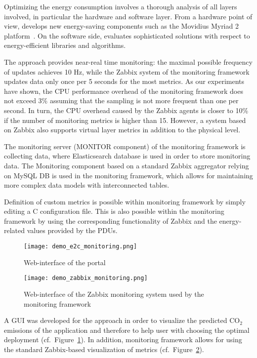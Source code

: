 \documentclass[10pt,letterpaper]{IEEEtran}
\begin{document}
Optimizing the energy consumption involves a thorough analysis of all layers involved, in particular the
hardware and software layer. From a hardware point of view, \EXCESS develops new energy-saving components
such as the Movidius Myriad 2 platform~\cite{movidius14}. On the software side, \EXCESS evaluates sophisticated solutions with respect to
energy-efficient libraries and algorithms. 

The \EXCESS approach provides near-real time monitoring: the maximal possible frequency of updates achieves 10 Hz,
while the Zabbix system of the \ECO monitoring framework updates data only once per 5 seconds for the most metrics.
As our experiments have shown, the CPU performance overhead of the \EXCESS monitoring framework does not
exceed 3\% assuming that the sampling is not more frequent than one per second.
In turn, the CPU overhead caused by the \ECO Zabbix agents is closer to 10\% if the number of monitoring metrics is
higher than 15. However, a system based on Zabbix also supports virtual layer metrics
in addition to the physical level. 

The monitoring server (MONITOR component) of the \EXCESS monitoring framework is collecting data,
where Elasticsearch database is used in order to store monitoring data.
The \ECO Monitoring component based on a standard Zabbix aggregator relying on
MySQL DB is used in the \ECO monitoring framework, which allows for maintaining more complex
data models with interconnected tables.

Definition of custom metrics is possible within \EXCESS monitoring framework by simply editing a C configuration file.
This is also possible within the \ECO monitoring framework by using the corresponding functionality of Zabbix
and the energy-related values provided by the PDUs.



\begin{figure}[t]
	\centering
	\texttt{[image: demo\_e2c\_monitoring.png]}
	\caption{Web-interface of the \ECO portal}
	\label{fig:demo_e2c_monitoring}
\end{figure}

\begin{figure}[t]
	\centering
	\texttt{[image: demo\_zabbix\_monitoring.png]}
	\caption{Web-interface of the Zabbix monitoring system used by the \ECO monitoring framework}
	\label{fig:demo_zabbix_monitoring}
\end{figure}

A GUI was developed for the \ECO approach in order to visualize the predicted $\mathrm{CO_2}$
emissions of the application and therefore to help user with choosing the optimal deployment
(cf.~Figure~\ref{fig:demo_e2c_monitoring}).
In addition, \ECO monitoring framework allows for using the standard Zabbix-based
visualization of metrics (cf.~Figure~\ref{fig:demo_zabbix_monitoring}).
\end{document}
